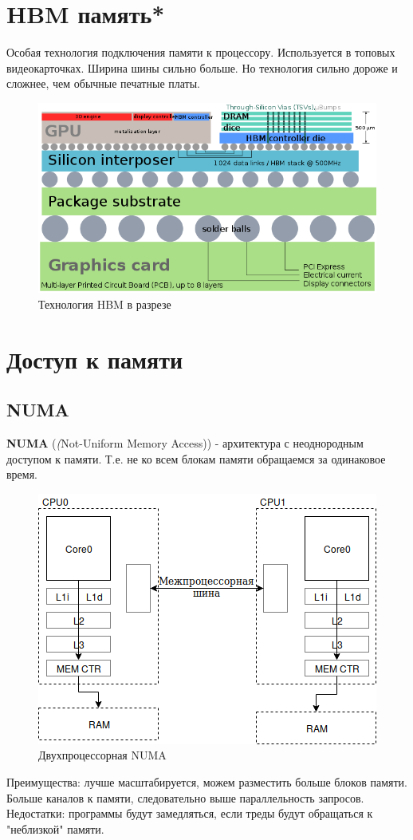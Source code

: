 \documentclass[12pt, a4paper]{article}
\begin{document}
\section{HBM память*}
Особая технология подключения памяти к процессору. Используется в топовых видеокарточках. Ширина шины сильно больше. Но технология сильно дороже и сложнее, чем обычные печатные платы.
\begin{figure}[h!]
    \centering
    \includegraphics[scale=0.4]{./images/HBM.png}
    \caption{Технология HBM в разрезе}
    \label{fig:HBM}
\end{figure}
\section{Доступ к памяти}
\subsection{NUMA}
\textbf{NUMA} (\textit(Not-Uniform Memory Access)) - архитектура с неоднородным доступом к памяти. Т.е. не ко всем блокам памяти обращаемся за одинаковое время.
\begin{figure}[h!]
    \centering
    \includegraphics[scale=0.4]{./images/2CPUNUMA.png}
    \caption{Двухпроцессорная NUMA}
    \label{fig:NUMA}
\end{figure}
Преимущества: лучше масштабируется, можем разместить больше блоков памяти. Больше каналов к памяти, следовательно выше параллельность запросов.\\
Недостатки: программы будут замедляться, если треды будут обращаться к "неблизкой" памяти.
\end{document}
